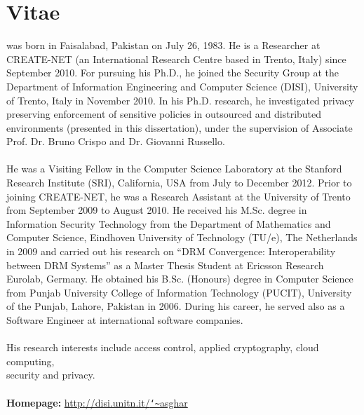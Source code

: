 \documentclass[epsfig,a4paper,11pt,titlepage]{book}
\newcommand{\clearemptydoublepage}{\newpage{\pagestyle{empty}\cleardoublepage}}
\numberwithin{algorithm}{chapter}
\begin{document}
\clearemptydoublepage

\chapter{Vitae}
\label{app:biography}

 was born in Faisalabad, Pakistan on July 26, 1983. He is a Researcher at CREATE-NET (an International Research Centre based in Trento, Italy) since September 2010. For pursuing his Ph.D., he joined the Security Group at the Department of Information Engineering and Computer Science (DISI), University of Trento, Italy in November 2010. In his Ph.D. research, he investigated privacy preserving enforcement of sensitive policies in outsourced and distributed environments (presented in this dissertation), under the supervision of Associate Prof. Dr. Bruno Crispo and Dr. Giovanni Russello. \\ \\
He was a Visiting Fellow in the Computer Science Laboratory at the Stanford Research Institute (SRI), California, USA from July to December 2012. Prior to joining CREATE-NET, he was a Research Assistant at the University of Trento from September 2009 to August 2010. He received his M.Sc. degree in Information Security Technology from the Department of Mathematics and Computer Science, Eindhoven University of Technology (TU/e), The Netherlands in 2009 and carried out his research on ``DRM Convergence: Interoperability between DRM Systems'' as a Master Thesis Student at Ericsson Research Eurolab, Germany. He obtained his B.Sc. (Honours) degree in Computer Science from Punjab University College of Information Technology (PUCIT), University of the Punjab, Lahore, Pakistan in 2006. During his career, he served also as a Software Engineer at international software companies. \\ \\
His research interests include access control, applied cryptography, cloud computing, \\ security and privacy. \\ \\
\textbf{Homepage:} \href{http://disi.unitn.it/~asghar/}{http://disi.unitn.it/\texttt{\char`\~}asghar}
\end{document}
